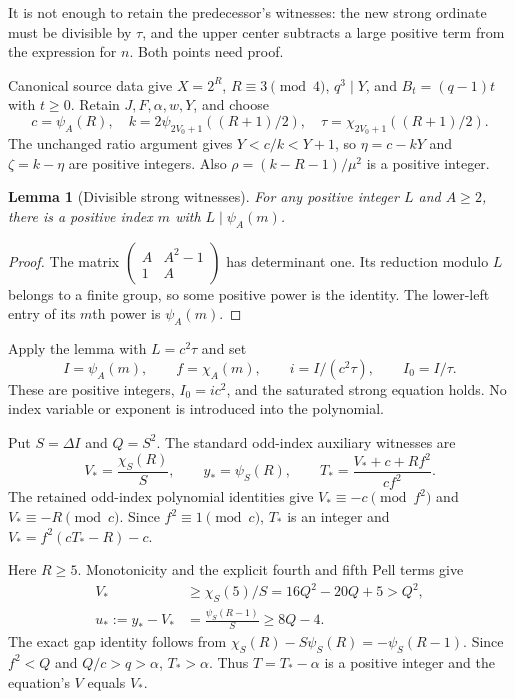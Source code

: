 \documentclass[11pt]{article}
\newtheorem{lemma}[theorem]{Lemma}
\theoremstyle{remark}\newtheorem{remark}[theorem]{Remark}
\begin{document}
It is not enough to retain the predecessor's witnesses: the new strong
ordinate must be divisible by $\tau$, and the upper center subtracts a large
positive term from the expression for $n$. Both points need proof.

Canonical source data give $X=2^R$, $R\equiv3\pmod4$,
$q^3\mid Y$, and $B_t=(q-1)t$ with $t\ge0$. Retain $J,F,\alpha,w,Y$,
and choose
\[
c=\psi_A(R),\quad
k=2\psi_{2V_0+1}((R+1)/2),\quad
\tau=\chi_{2V_0+1}((R+1)/2).
\]
The unchanged ratio argument gives $Y<c/k<Y+1$, so
$\eta=c-kY$ and $\zeta=k-\eta$ are positive integers. Also
$\rho=(k-R-1)/\mu^2$ is a positive integer.

\begin{lemma}[Divisible strong witnesses]
For any positive integer $L$ and $A\ge2$, there is a positive index $m$
with $L\mid\psi_A(m)$.
\end{lemma}
\begin{proof}
The matrix $\begin{pmatrix}A&A^2-1\\1&A\end{pmatrix}$ has determinant one.
Its reduction modulo $L$ belongs to a finite group, so some positive power
is the identity. The lower-left entry of its $m$th power is $\psi_A(m)$.
\end{proof}

Apply the lemma with $L=c^2\tau$ and set
\[
I=\psi_A(m),\qquad f=\chi_A(m),\qquad
i=I/(c^2\tau),\qquad I_0=I/\tau.
\]
These are positive integers, $I_0=ic^2$, and the saturated strong equation
holds. No index variable or exponent is introduced into the polynomial.

Put $S=\Delta I$ and $Q=S^2$. The standard odd-index auxiliary witnesses are
\[
V_*=\frac{\chi_S(R)}{S},\qquad y_*={\psi_S(R)},\qquad
T_*=\frac{V_*+c+Rf^2}{cf^2}.
\]
The retained odd-index polynomial identities give
$V_*\equiv-c\pmod{f^2}$ and $V_*\equiv-R\pmod c$.
Since $f^2\equiv1\pmod c$, $T_*$ is an integer and
$V_*=f^2(cT_*-R)-c$.

Here $R\ge5$. Monotonicity and the explicit fourth and fifth Pell terms give
\begin{align*}
V_*&\ge\chi_S(5)/S=16Q^2-20Q+5>Q^2,\\
u_*:=y_*-V_*&=\frac{\psi_S(R-1)}{S}\ge8Q-4.
\end{align*}
The exact gap identity follows from
$\chi_S(R)-S\psi_S(R)=-\psi_S(R-1)$.
Since $f^2<Q$ and $Q/c>q>\alpha$, $T_*>\alpha$.
Thus $T=T_*-\alpha$ is a positive integer and the equation's $V$ equals $V_*$.
\end{document}
